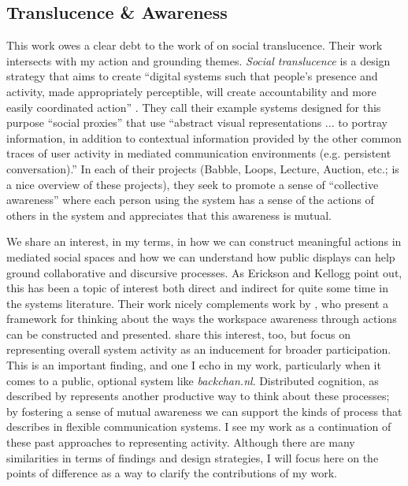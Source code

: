 \subsection{Translucence \& Awareness}

This work owes a clear debt to the work of \citet{Erickson:2000kb} on social translucence. Their work intersects with my action and grounding themes. \emph{Social translucence} is a design strategy that aims to create ``digital systems such that people's presence and activity, made appropriately perceptible, will create accountability and more easily coordinated action''  \citep{Kellogg:2002ts}. They call their example systems designed for this purpose ``social proxies'' that use ``abstract visual representations ... to portray information, in addition to contextual information provided by the other common traces of user activity in mediated communication environments (e.g. persistent conversation).'' In each of their projects (Babble, Loops, Lecture, Auction, etc.; \citep{Erickson:2003td} is a nice overview of these projects), they seek to promote a sense of ``collective awareness'' where each person using the system has a sense of the actions of others in the system and appreciates that this awareness is mutual. 

We share an interest, in my terms, in how we can construct meaningful actions in mediated social spaces and how we can understand how public displays can help ground collaborative and discursive processes. As Erickson and Kellogg point out, this has been a topic of interest both direct and indirect for quite some time in the systems literature. Their work nicely complements work by \citet{Gutwin:2002tf}, who present a framework for thinking about the ways the workspace awareness through actions can be constructed and presented.  \citet{Ackerman:1995tj} share this interest, too, but focus on representing overall system activity as an inducement for broader participation. This is an important finding, and one I echo in my work, particularly when it comes to a public, optional system like \emph{backchan.nl}. Distributed cognition, as described by \citet{Hollan:2000ud} represents another productive way to think about these processes; by fostering a sense of mutual awareness we can support the kinds of process that \citet{Hutchins:1995ud} describes in flexible communication systems. I see my work as a continuation of these past approaches to representing activity. Although there are many similarities in terms of findings and design strategies, I will focus here on the points of difference as a way to clarify the contributions of my work.

